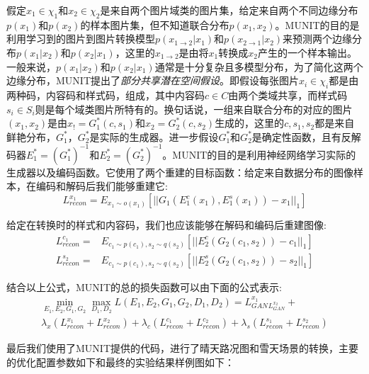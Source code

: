 假定$x_1\in \chi_1$和$x_2\in \chi_2$是来自两个图片域类的图片集，给定来自两个不同边缘分布$p(x_1)$和$p(x_2)$的样本图片集，但不知道联合分布$p(x_1, x_2)$。MUNIT的目的是利用学习到的图片到图片转换模型$p(x_{1\to 2}|x_1)$和$p(x_{2\to 1}|x_2)$来预测两个边缘分布$p(x_1|x_2)$和$p(x_2|x_1)$，这里的$x_{1\to 2}$是由将$x_1$转换成$x_2$产生的一个样本输出。一般来说，$p(x_1|x_2)$和$p(x_2|x_1)$通常是十分复杂且多模型分布，为了简化这两个边缘分布，MUNIT提出了\textit{部分共享潜在空间假设}。即假设每张图片$x_i\in \chi_i$都是由两种码，内容码和样式码，组成，其中内容码$c\in C$由两个类域共享，而样式码$s_i\in S_i$则是每个域类图片所特有的。换句话说，一组来自联合分布的对应的图片$(x_1, x_2)$是由$x_!=G_1^*(c,s_1)$和$x_2=G_2^*(c, s_2)$生成的，这里的$c,s_1,s_2$都是来自鲜艳分布，$G_1^*，G_2^*$是实际的生成器。进一步假设$G_1^*$和$G_2^*$是确定性函数，且有反解码器$E_1^*=(G_1^*)^{-1}$和$E_2^*=(G_2^*)^{-1}$。MUNIT的目的是利用神经网络学习实际的生成器以及编码函数。它使用了两个重建的目标函数：给定来自数据分布的图像样本，在编码和解码后我们能够重建它:
$$L_{recon}^{x_1}=E_{x_1\sim o(x_1)}[||G_1(E_1^c(x_1), E_1^s(x_1))-x_1||_1] $$

给定在转换时的样式和内容码，我们也应该能够在解码和编码后重建图像:
\begin{align*}
    L_{recon}^{c_1}= & E_{c_1\sim p(c_1), s_2\sim q(s_2)}[||E_2^c(G_2(c_1,s_2))-c_1||_1] \\
    L_{recon}^{s_2}= & E_{c_1\sim p(c_1), s_2\sim q(s_2)}[||E_2^s(G_2(c_1, s_2))-s_2||_1]
\end{align*}

结合以上公式，MUNIT的总的损失函数可以由下面的公式表示:
\begin{gather*}
\min_{E_1,E_2,G_1,G_2}\max_{D_1,D_2}L(E_1,E_2,G_1,G_2,D_1,D_2)=L_{GAN}^{x_1}_L_{GAN}^{x_2}+\\
\lambda_x(L_{recon}^{x_1}+L_{recon}^{x_2})+\lambda_c(L_{recon}^{c_1}+L_{recon}^{c_2})+\lambda_s(L_{recon}^{s_1}+L_{recon}^{s_2})
\end{gather*}

最后我们使用了MUNIT提供的代码，进行了晴天路况图和雪天场景的转换，主要的优化配置参数如下和最终的实验结果样例图如下：

